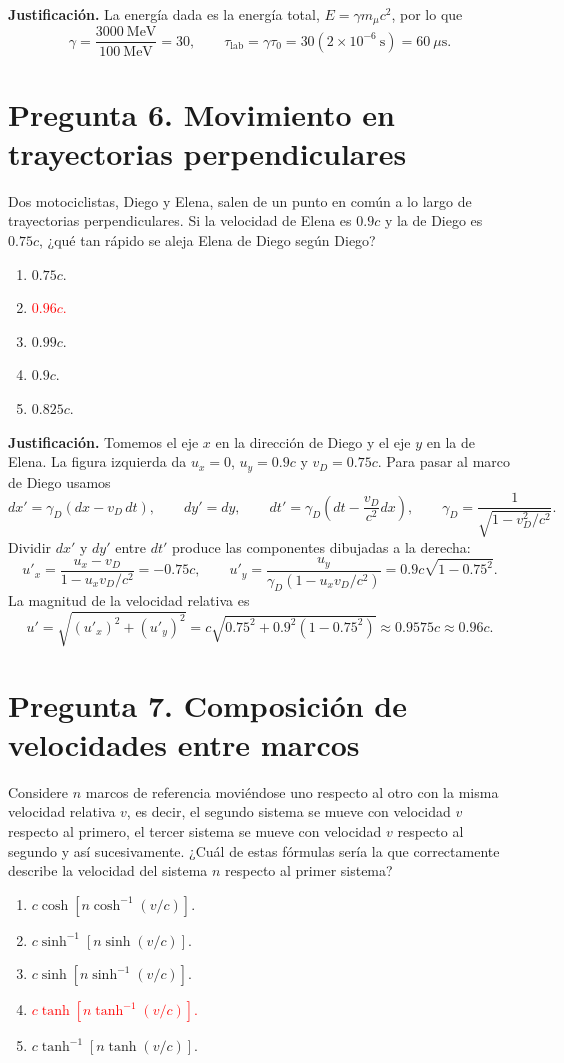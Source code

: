 \documentclass[a4paper,11pt]{article}
\newcommand{\pregunta}[2]{\section*{Pregunta #1. #2}}
\begin{document}
\textbf{Justificación.} La energía dada es la energía total, $E=\gamma m_\mu c^2$, por lo que
\[
\gamma=\frac{3000\ \mathrm{MeV}}{100\ \mathrm{MeV}}=30,
\qquad
\tau_{\mathrm{lab}}=\gamma\tau_0
=30(2\times10^{-6}\ \mathrm{s})=60\ \mu\mathrm{s}.
\]

\pregunta{6}{Movimiento en trayectorias perpendiculares}

Dos motociclistas, Diego y Elena, salen de un punto en común a lo largo de trayectorias perpendiculares. Si la velocidad de Elena es $0.9c$ y la de Diego es $0.75c$, ¿qué tan rápido se aleja Elena de Diego según Diego?

\begin{enumerate}
    \item $0.75c$.
    \item \textcolor{red}{$0.96c$.}
    \item $0.99c$.
    \item $0.9c$.
    \item $0.825c$.
\end{enumerate}

\begin{figure}[H]
\centering

\end{figure}

\textbf{Justificación.} Tomemos el eje $x$ en la dirección de Diego y el eje $y$ en la de Elena. La figura izquierda da $u_x=0$, $u_y=0.9c$ y $v_D=0.75c$. Para pasar al marco de Diego usamos
\[
dx'=\gamma_D(dx-v_D\,dt),\qquad dy'=dy,\qquad
dt'=\gamma_D\left(dt-\frac{v_D}{c^2}dx\right),
\qquad \gamma_D=\frac{1}{\sqrt{1-v_D^2/c^2}}.
\]
Dividir $dx'$ y $dy'$ entre $dt'$ produce las componentes dibujadas a la derecha:
\[
u'_x=\frac{u_x-v_D}{1-u_xv_D/c^2}=-0.75c,
\qquad
u'_y=\frac{u_y}{\gamma_D(1-u_xv_D/c^2)}
=0.9c\sqrt{1-0.75^2}.
\]
La magnitud de la velocidad relativa es
\[
u'=\sqrt{(u'_x)^2+(u'_y)^2}
=c\sqrt{0.75^2+0.9^2(1-0.75^2)}
\approx0.9575c\approx0.96c.
\]

\pregunta{7}{Composición de velocidades entre marcos}

Considere $n$ marcos de referencia moviéndose uno respecto al otro con la misma velocidad relativa $v$, es decir, el segundo sistema se mueve con velocidad $v$ respecto al primero, el tercer sistema se mueve con velocidad $v$ respecto al segundo y así sucesivamente. ¿Cuál de estas fórmulas sería la que correctamente describe la velocidad del sistema $n$ respecto al primer sistema?

\begin{enumerate}[itemsep=0.6em]
    \item $c\cosh\!\left[n\cosh^{-1}(v/c)\right]$.
    \item $c\sinh^{-1}\!\left[n\sinh(v/c)\right]$.
    \item $c\sinh\!\left[n\sinh^{-1}(v/c)\right]$.
    \item \textcolor{red}{$c\tanh\!\left[n\tanh^{-1}(v/c)\right]$.}
    \item $c\tanh^{-1}\!\left[n\tanh(v/c)\right]$.
\end{enumerate}
\end{document}
